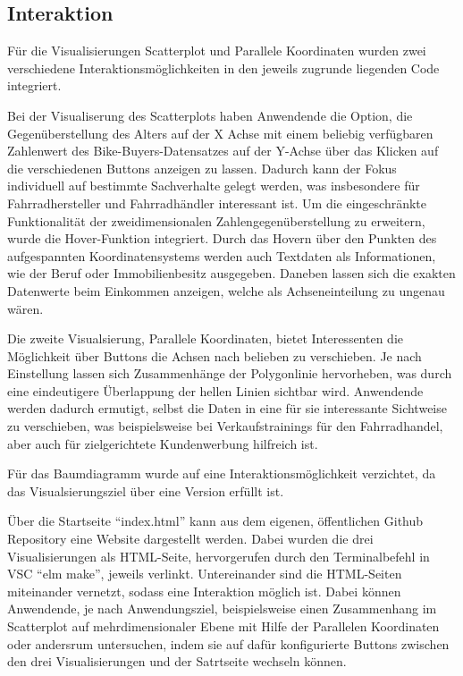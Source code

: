 \documentclass[usegeometry=true]{scrartcl}
\begin{document}
\subsection{Interaktion}
Für die Visualisierungen Scatterplot und Parallele Koordinaten wurden zwei verschiedene Interaktionsmöglichkeiten in den jeweils zugrunde liegenden Code integriert. 

Bei der Visualiserung des Scatterplots haben Anwendende die Option, die Gegenüberstellung des Alters auf der X Achse mit einem beliebig verfügbaren Zahlenwert des Bike-Buyers-Datensatzes auf der Y-Achse  über das Klicken auf die verschiedenen Buttons anzeigen zu lassen. Dadurch kann der Fokus individuell auf bestimmte Sachverhalte gelegt werden, was insbesondere für Fahrradhersteller und Fahrradhändler interessant ist. Um die eingeschränkte Funktionalität der zweidimensionalen Zahlengegenüberstellung zu erweitern, wurde die Hover-Funktion integriert. Durch das Hovern über den Punkten des aufgespannten Koordinatensystems werden auch Textdaten als Informationen, wie der Beruf oder Immobilienbesitz ausgegeben. Daneben lassen sich die exakten Datenwerte beim Einkommen anzeigen, welche als Achseneinteilung zu ungenau wären. 

Die zweite Visualsierung, Parallele Koordinaten, bietet Interessenten die Möglichkeit über Buttons die Achsen nach belieben zu verschieben. Je nach Einstellung lassen sich Zusammenhänge der Polygonlinie hervorheben, was durch eine eindeutigere Überlappung der hellen Linien sichtbar wird. Anwendende werden dadurch ermutigt, selbst die Daten in eine für sie interessante Sichtweise zu verschieben, was beispielsweise bei Verkaufstrainings für den Fahrradhandel, aber auch für zielgerichtete Kundenwerbung hilfreich ist. 

Für das Baumdiagramm wurde auf eine Interaktionsmöglichkeit verzichtet, da das Visualsierungsziel über eine Version erfüllt ist. 

Über die Startseite "`index.html"' kann aus dem eigenen, öffentlichen Github Repository eine Website dargestellt werden. Dabei wurden die drei Visualisierungen als HTML-Seite, hervorgerufen durch  den Terminalbefehl in VSC "`elm make"', jeweils verlinkt. Untereinander sind die HTML-Seiten miteinander vernetzt, sodass eine Interaktion möglich ist. Dabei können Anwendende, je nach Anwendungsziel, beispielsweise einen Zusammenhang im Scatterplot auf mehrdimensionaler Ebene mit Hilfe der Parallelen Koordinaten oder andersrum untersuchen, indem sie auf dafür konfigurierte Buttons zwischen den drei Visualisierungen und der Satrtseite wechseln können.
\end{document}
